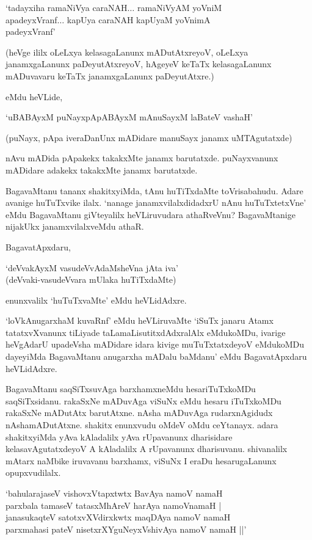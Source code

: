 \begin{shloka}
`tadayxiha ramaNiVya caraNAH$\ldots$ ramaNiVyAM yoVniM\\
apadeyxVranf$\ldots$ kapUya caraNAH kapUyaM yoVnimA\\
padeyxVranf'
\end{shloka}

(heVge ililx oLeLxya kelasagaLanunx mADutAtxreyoV, oLeLxya janamxgaLanunx paDeyutAtxreyoV, hAgeyeV keTaTx kelasagaLanunx mADuvavaru keTaTx janamxgaLanunx paDeyutAtxre.)

eMdu heVLide,

\begin{shloka}
`uBABAyxM puNayxpApABAyxM mAnuSayxM laBateV vashaH'
\end{shloka}

(puNayx, pApa iveraDanUnx mADidare manuSayx janamx uMTAgutatxde)

nAvu mADida pApakekx takakxMte janamx barutatxde. puNayxvanunx mADidare adakekx takakxMte janamx barutatxde.

BagavaMtanu tananx shakitxyiMda, tAnu huTiTxdaMte toVrisabahudu. Adare avanige huTuTxvike ilalx. `nanage janamxvilalxdidadxrU nAnu huTuTxtetxVne' eMdu BagavaMtanu giVteyalilx heVLiruvudara athaRveVnu? BagavaMtanige nijakUkx janamxvilalxveMdu athaR.

BagavatApxdaru,

\begin{shloka}
`deVvakAyxM vasudeVvAdaMsheVna jAta iva'\\
(deVvaki-vasudeVvara mUlaka huTiTxdaMte)
\end{shloka}

enunxvalilx `huTuTxvaMte' eMdu heVLidAdxre.

`loVkAnugarxhaM kuvaRnf' eMdu heVLiruvaMte `iSuTx janaru Atamx tatatxvXvanunx tiLiyade taLamaLisutitxdAdxralAlx eMdukoMDu, ivarige heVgAdarU upadeVsha mADidare idara kivige muTuTxtatxdeyoV eMdukoMDu dayeyiMda BagavaMtanu anugarxha mADalu baMdanu' eMdu BagavatApxdaru heVLidAdxre.


BagavaMtanu saqSiTxsuvAga barxhamxneMdu hesariTuTxkoMDu saqSiTxsidanu. rakaSxNe mADuvAga viSuNx eMdu hesaru iTuTxkoMDu rakaSxNe mADutAtx barutAtxne. nAsha mADuvAga rudarxnAgidudx nAshamADutAtxne. shakitx enunxvudu oMdeV oMdu ceYtanayx. adara shakitxyiMda yAva kAladalilx yAva rUpavanunx dharisidare kelasavAgutatxdeyoV A kAladalilx A rUpavanunx dharisuvanu. shivanalilx mAtarx naMbike iruvavanu barxhamx, viSuNx I eraDu hesarugaLanunx opupxvudilalx.


\begin{shloka}
`bahularajaseV vishovxVtapxtwtx BavAya namoV namaH\\
parxbala tamaseV tatasxMhAreV harAya namoVnamaH‌ |\\
janasukaqteV satotxvXVdirxkwtx maqDAya namoV namaH\\
parxmahasi pateV nisetxrXYguNeyxVshivAya namoV namaH ||'
\end{shloka}

